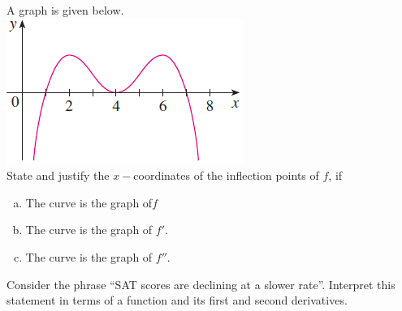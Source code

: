 \documentclass[notes]{subfiles}
\begin{document}
		\begin{ex}
			A graph is given below.\\  
			\includegraphics{4.5fig3}\\
			State and justify the \(x-\)coordinates of the inflection points of \(f\), if
			\begin{enumerate}[(a)]
				\item The curve is the graph of\(f\)
					
				\item The curve is the graph of \(f'\).
					
				\item The curve is the graph of \(f''\).
			\end{enumerate}		
		\end{ex}
		
		\begin{ex}
			Consider the phrase ``SAT scores are declining at a slower rate''.  Interpret this statement in terms of a function and its first and second derivatives.
		\end{ex}
\clearpage
\end{document}
